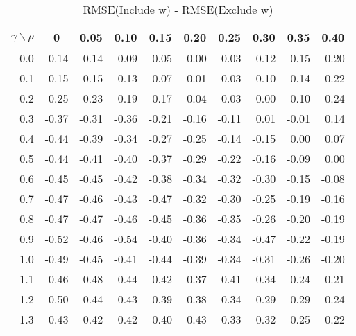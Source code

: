 \documentclass[12pt]{article}
\begin{document}
%
\begin{table}[!tbp]
\caption{RMSE(Include w) - RMSE(Exclude w)}
 \begin{center}
 \begin{tabular}{r|rrrrrrrrr}\hline\hline
\multicolumn{1}{c|}{$\gamma\backslash\rho$}&\multicolumn{1}{c}{0}&\multicolumn{1}{c}{0.05}&\multicolumn{1}{c}{0.10}&\multicolumn{1}{c}{0.15}&\multicolumn{1}{c}{0.20}&\multicolumn{1}{c}{0.25}&\multicolumn{1}{c}{0.30}&\multicolumn{1}{c}{0.35}&\multicolumn{1}{c}{0.40}\tabularnewline
\hline

0.0&-0.14&-0.14&-0.09&-0.05& 0.00& 0.03& 0.12& 0.15& 0.20\tabularnewline
0.1&-0.15&-0.15&-0.13&-0.07&-0.01& 0.03& 0.10& 0.14& 0.22\tabularnewline
0.2&-0.25&-0.23&-0.19&-0.17&-0.04& 0.03& 0.00& 0.10& 0.24\tabularnewline
0.3&-0.37&-0.31&-0.36&-0.21&-0.16&-0.11& 0.01&-0.01& 0.14\tabularnewline
0.4&-0.44&-0.39&-0.34&-0.27&-0.25&-0.14&-0.15& 0.00& 0.07\tabularnewline
0.5&-0.44&-0.41&-0.40&-0.37&-0.29&-0.22&-0.16&-0.09& 0.00\tabularnewline
0.6&-0.45&-0.45&-0.42&-0.38&-0.34&-0.32&-0.30&-0.15&-0.08\tabularnewline
0.7&-0.47&-0.46&-0.43&-0.47&-0.32&-0.30&-0.25&-0.19&-0.16\tabularnewline
0.8&-0.47&-0.47&-0.46&-0.45&-0.36&-0.35&-0.26&-0.20&-0.19\tabularnewline
0.9&-0.52&-0.46&-0.54&-0.40&-0.36&-0.34&-0.47&-0.22&-0.19\tabularnewline
1.0&-0.49&-0.45&-0.41&-0.44&-0.39&-0.34&-0.31&-0.26&-0.20\tabularnewline
1.1&-0.46&-0.48&-0.44&-0.42&-0.37&-0.41&-0.34&-0.24&-0.21\tabularnewline
1.2&-0.50&-0.44&-0.43&-0.39&-0.38&-0.34&-0.29&-0.29&-0.24\tabularnewline
1.3&-0.43&-0.42&-0.42&-0.40&-0.43&-0.33&-0.32&-0.25&-0.22\tabularnewline
\hline
\end{tabular}

\end{center}

\end{table}





%
\end{document}
